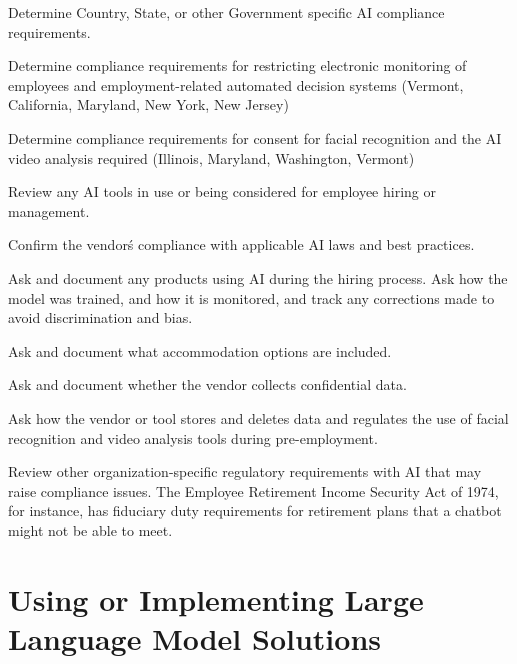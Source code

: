 \begin{minipage}{\linewidth}
\begin{checklist}
  \item Determine Country, State, or other Government specific AI compliance
  requirements.
  \item Determine compliance requirements for restricting electronic monitoring
  of employees and employment-related automated decision systems (Vermont,
  California, Maryland, New York, New Jersey)
  \item Determine compliance requirements for consent for facial recognition
  and the AI video analysis required (Illinois, Maryland, Washington, Vermont)
  \item Review any AI tools in use or being considered for employee hiring or
  management.
  \item Confirm the vendor\'s compliance with applicable AI laws and best
  practices.
  \item Ask and document any products using AI during the hiring process. Ask
  how the model was trained, and how it is monitored, and track any corrections
  made to avoid discrimination and bias.
  \item Ask and document what accommodation options are included.
  \item Ask and document whether the vendor collects confidential data.
  \item Ask how the vendor or tool stores and deletes data and regulates the
  use of facial recognition and video analysis tools during pre-employment.
  \item Review other organization-specific regulatory requirements with AI that
  may raise compliance issues. The Employee Retirement Income Security Act of
  1974, for instance, has fiduciary duty requirements for retirement plans that
  a chatbot might not be able to meet.
\end{checklist}
\end{minipage}

\section{Using or Implementing Large Language Model Solutions}

